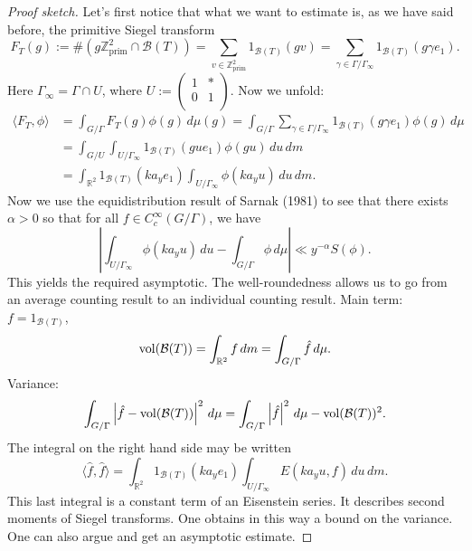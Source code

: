 \documentclass[reqno]{amsart} 
\begin{document}
\begin{proof}[Proof sketch]
  Let's first notice that what we want to estimate is, as we have said before, the primitive Siegel transform
  \begin{equation*}
    F_T(g) := \#(g \mathbb{Z}^2_{\mathrm{prim}} \cap \mathcal{B}(T)) = \sum_{v \in \mathbb{Z}^2_{\mathrm{prim}}} 1_{\mathcal{B}(T)}(g v)
    = \sum_{\gamma \in \Gamma / \Gamma_\infty} 1_{\mathcal{B}(T)}(g \gamma e_1).
  \end{equation*}
  Here $\Gamma_\infty = \Gamma \cap U$, where $U := \left(
    \begin{smallmatrix}
      1&\ast\\
      0       &1 \\
    \end{smallmatrix}
  \right)$.  Now we unfold:
  \begin{align*}
    \langle F_T, \phi \rangle &= \int_{G / \Gamma} F_T(g) \phi(g) \, d \mu(g) =
    \int_{G / \Gamma} \sum_{\gamma \in \Gamma / \Gamma_\infty} 1_{\mathcal{B}(T)}
                 (g \gamma e_1) \phi(g) \, d \mu  \\
               &= \int_{G / U} \int_{U / \Gamma_\infty}
                 1_{\mathcal{B}(T)}(g u e_1) \phi(g u)
                 \, d u \, d m \\
               &=
                 \int_{\mathbb{R}^2} 1_{\mathcal{B}(T)}(k a_y e_1)
                 \int_{U / \Gamma_\infty}
                 \phi(k a_y u) \, d u \, d m.
  \end{align*}
  Now we use the equidistribution result of Sarnak (1981) to see that there exists $\alpha > 0$ so that for all $f \in C_c^\infty(G / \Gamma)$, we have
  \begin{equation*}
    \left| \int_{U / \Gamma_\infty} \phi(k a_y u) \, d u - \int_{G / \Gamma} \phi \, d \mu \right|
    \ll y^{- \alpha} S(\phi).    
  \end{equation*}
  This yields the required asymptotic.  The well-roundedness allows us to go from an average counting result to an individual counting result.  Main term: $f = 1_{\mathcal{B}(T)}$,
  \begin{equation*}
    \operatorname{vol}(\mathcal{B}(T)) = \int_{\mathbb{R}^2} f \, d m
    = \int_{G / \Gamma} \hat{f} \, d \mu.
  \end{equation*}
  Variance:
  \begin{equation*}
    \int_{G / \Gamma} \left| \hat{f} - \operatorname{vol}(\mathcal{B}(T)) \right|^2 \, d \mu
    =
    \int_{G / \Gamma} \left| \hat{f} \right|^2 \, d \mu
    -
    \operatorname{vol}(\mathcal{B}(T))^2.    
  \end{equation*}
  The integral on the right hand side may be written
  \begin{equation*}
    \langle \hat{f}, \hat{f} \rangle =
    \int_{\mathbb{R}^2} 1_{\mathcal{B}(T)}(k a_y e_1)
    \int_{U / \Gamma_\infty}
    E(k a_y u, f) \, d u \, d m.
  \end{equation*}
  This last integral is a constant term of an Eisenstein series.  It describes second moments of Siegel transforms.  One obtains in this way a bound on the variance.  One can also argue and get an asymptotic estimate.
\end{proof}
\end{document}
